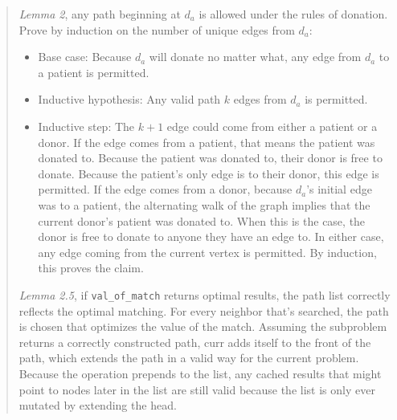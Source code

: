 \documentclass[11pt]{article}
\begin{document}
\begin{enumerate}
\begin{enumerate}
\begin{quote}
      \medskip
      \textit{Lemma 2}, any path beginning at $d_a$ is allowed under the rules of donation. Prove by induction on the number of unique edges from $d_a$:
      \begin{itemize}
        \item Base case: Because $d_a$ will donate no matter what, any edge from $d_a$ to a patient is permitted. 
        \item Inductive hypothesis: Any valid path $k$ edges from $d_a$ is permitted.  
        \item Inductive step: The $k + 1$ edge could come from either a patient or a donor. If the edge comes from a patient, that means the patient was donated to. Because the patient was donated to, their donor is free to donate. Because the patient's only edge is to their donor, this edge is permitted. If the edge comes from a donor, because $d_a$'s initial edge was to a patient, the alternating walk of the graph implies that the current donor's patient was donated to. When this is the case, the donor is free to donate to anyone they have an edge to. In either case, any edge coming from the current vertex is permitted. By induction, this proves the claim. 
      \end{itemize}

      \medskip
      \textit{Lemma 2.5}, if \texttt{val\_of\_match} returns optimal results, the path list correctly reflects the optimal matching. For every neighbor that's searched, the path is chosen that optimizes the value of the match. Assuming the subproblem returns a correctly constructed path, curr adds itself to the front of the path, which extends the path in a valid way for the current problem. Because the operation prepends to the list, any cached results that might point to nodes later in the list are still valid because the list is only ever mutated by extending the head. 


\end{quote}
\end{enumerate}
\end{enumerate}
\end{document}
